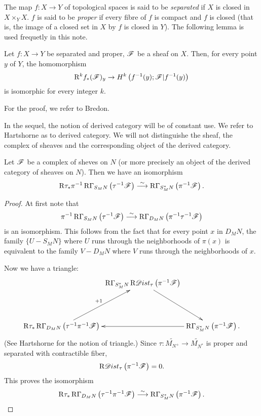 \begin{rem}
    The map \(f\colon X\to Y\) of topological spaces is 
    said to be \emph{separated} if \(X\) is closed 
    in \(X\times_Y X\). 
    \(f\) is said to be \emph{proper} 
    if every fibre of \(f\) is compact 
    and \(f\) is closed (that is, the image of a closed set 
    in \(X\) by \(f\) is closed in \(Y\)). 
    The following lemma is used frequetly in this note.
\end{rem}

\begin{lem}
    Let \(f\colon X\to Y\) be separated and proper, 
    \(\mathscr{F}\) be a sheaf on \(X\). 
    Then, for every point \(y\) of \(Y\), the homomorphism
    \[
        \mathrm{R}^k{f}_\ast(\mathscr{F})_{y}\to
        H^k\left(f^{-1}(y);\mathscr{F}\rvert{f^{-1}(y)}\right)
    \]
    is isomorphic for every integer \(k\).
\end{lem}
For the proof, we refer to Bredon.

In the sequel, 
the notion of derived category will be of constant use. 
We refer to Hartshorne as to derived category. 
We will not distinguishe the sheaf, 
the complex of sheaves and the corresponding object 
of the derived category. 

\begin{prp}
    Let \(\mathscr{F}\) be a complex of sheves on \(N\) (or more precisely an object of the derived category of sheaves on \(N\)). 
    Then we have an isomorphism
    \[
        \mathrm{R}{\tau_\ast}\pi^{-1}\mathop{\mathrm{R}\hspace{-0pt}\Gamma}\nolimits_{S_{M}N}\left(
            \tau^{-1}\mathscr{F}
        \right)
        \mathrel{\overset{\sim}{\longrightarrow}}
        \mathop{\mathrm{R}\hspace{-0pt}\Gamma}\nolimits_{S_{M}^\ast{N}}\left(\pi^{-1}\mathscr{F}\right).
    \]
\end{prp}
\begin{proof}
    At first note that
    \[
        \pi^{-1}\mathop{\mathrm{R}\hspace{-0pt}\Gamma}\nolimits_{S_{M}N}\left(
            \tau^{-1}\mathscr{F}
        \right)
        \mathrel{\overset{\sim}{\longrightarrow}}
        \mathop{\mathrm{R}\hspace{-0pt}\Gamma}\nolimits_{D_{M}{N}}\left(\pi^{-1}\tau^{-1}\mathscr{F}\right)
    \]
    is an isomorphism. 
    This follows from the fact that 
    for every point \(x\) in \(D_M{N}\), 
    the family \(\{U-S_M{N}\}\) where \(U\) runs through 
    the neighborhoods of \(\pi(x)\) is equivalent to 
    the family \(V - D_M{N}\) where \(V\) runs through 
    the neighborhoods of \(x\). 

    Now we have a triangle:
    \[    \vcenter{\xymatrix
    @C=2pt@R=42pt
    {
        &\RG_{S^{\ast}_{M}N}\Rder{\Dist}_{\tau}\left(
            \pi^{-1}\scF
        \right)
        \ar[dr]
        &\\
        \Rder{\tau_\ast}\RG_{D_{M}N}\left(
            \tau^{-1}\pi^{-1}\scF
        \right)
        \ar[ur]^-{+1}
        &&
        \RG_{S^{\ast}_{M}N}\left(
            \pi^{-1}\scF
        \right).
        \ar[ll]
    }}
\]
(See Hartshorne for the notion of triangle.) 
Since \(\tau\colon \widetilde{M_{N^+}}\to\widetilde{M_{N^\ast}}\) is proper and separated with contractible fiber, 
\[
    \mathrm{R}\mathscr{D}ist_{\tau}\left(\pi^{-1}\mathscr{F}\right)=0.
\]
This proves the isomorphism
\[
    \mathrm{R}{\tau_\ast}\mathop{\mathrm{R}\hspace{-0pt}\Gamma}\nolimits_{D_{M}N}\left(
            \tau^{-1}\pi^{-1}\mathscr{F}
    \right)
    \mathrel{\overset{\sim}{\longrightarrow}}    
    \mathop{\mathrm{R}\hspace{-0pt}\Gamma}\nolimits_{S^{\ast}_{M}N}\left(
            \pi^{-1}\mathscr{F}
    \right).\]
\end{proof}

